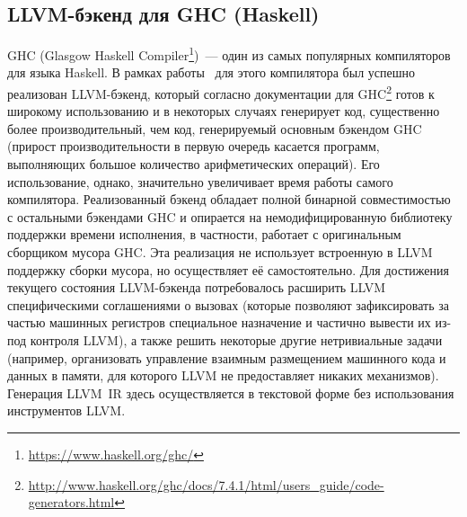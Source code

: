 \documentclass[a4paper, 12pt]{article}
\begin{document}
\subsection{LLVM-бэкенд для GHC (Haskell)}
GHC (Glasgow Haskell Compiler\footnote{\url{https://www.haskell.org/ghc/}})~--- один из самых популярных компиляторов
для
языка Haskell. В рамках работы~\cite{GHC} для этого компилятора был успешно реализован LLVM-бэкенд, который согласно
документации для GHC\footnote{\url{http://www.haskell.org/ghc/docs/7.4.1/html/users_guide/code-generators.html}} готов
к
широкому использованию и в некоторых
случаях генерирует код, существенно более производительный, чем код, генерируемый основным бэкендом GHC (прирост
производительности в первую очередь касается программ, выполняющих большое количество арифметических
операций). Его использование, однако, значительно увеличивает время работы самого компилятора. Реализованный бэкенд
обладает полной бинарной совместимостью с остальными бэкендами GHC и опирается на немодифицированную библиотеку
поддержки времени исполнения, в частности, работает с оригинальным сборщиком мусора GHC.
Эта реализация не использует встроенную в LLVM поддержку сборки мусора, но осуществляет её самостоятельно. Для
достижения текущего состояния LLVM-бэкенда потребовалось расширить LLVM специфическими соглашениями о вызовах
(которые позволяют зафиксировать за частью машинных регистров специальное назначение и частично вывести их из-под
контроля LLVM), а также решить некоторые другие нетривиальные задачи (например, организовать управление взаимным
размещением машинного кода и данных в памяти, для которого LLVM не предоставляет никаких механизмов). Генерация LLVM~IR
здесь осуществляется в текстовой форме без использования инструментов LLVM.
\end{document}
